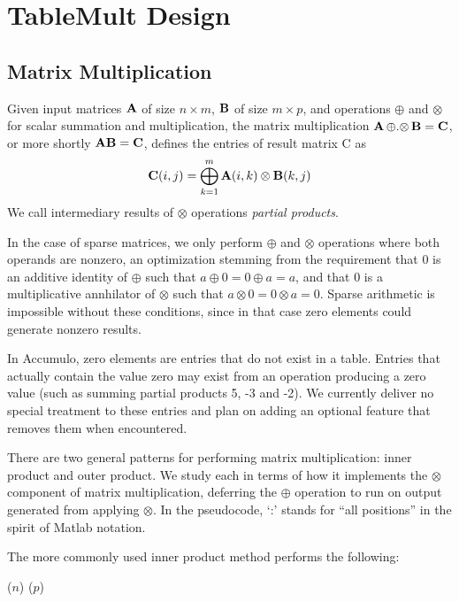 
\section{TableMult Design}
\label{sDesign}


\subsection{Matrix Multiplication}
Given input matrices $\mathbf{A}$ of size $n \times m$, $\mathbf{B}$ of size $m \times p$,
and operations $\oplus$ and $\otimes$ for scalar summation and multiplication,
the matrix multiplication $\mathbf{A} \,{\oplus}.{\otimes}\, \mathbf{B} = \mathbf{C}$, or more shortly $\mathbf{A}\mathbf{B} = \mathbf{C}$,
defines the entries of result matrix C as 
\[ \mathbf{C}(i,j) = \bigoplus_{k=1}^m \mathbf{A}(i,k) \otimes \mathbf{B}(k,j) \]
We call intermediary results of $\otimes$ operations \emph{partial products}.

In the case of sparse matrices, we only perform $\oplus$ and $\otimes$ operations where both operands are nonzero,
an optimization stemming from the requirement that 0 is an additive identity of $\oplus$ such that $a \oplus 0 = 0 \oplus a = a$,
and that 0 is a multiplicative annhilator of $\otimes$ such that $a \otimes 0 = 0 \otimes a = 0$.
Sparse arithmetic is impossible without these conditions, since in that case zero elements could generate nonzero results.

In Accumulo, zero elements are entries that do not exist in a table. Entries that actually contain the value zero may exist
from an operation producing a zero value (such as summing partial products 5, -3 and -2).  
We currently deliver no special treatment to these entries and plan on adding
an optional feature that removes them when encountered.

There are two general patterns for performing matrix multiplication: inner product and outer product.
We study each in terms of how it implements the $\otimes$ component of matrix multiplication,
deferring the $\oplus$ operation to run on output generated from applying $\otimes$.
In the pseudocode, `:' stands for ``all positions'' in the spirit of Matlab notation.

The more commonly used inner product method performs the following:
\begin{algorithm}[h]
\fore($n$){
\fore($p$){
}}
\end{algorithm}

